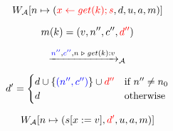 \begin{frame}
\end{frame}

\begin{frame}

  \pause
  \vspace{-0.50cm}
  \[
	W_{\mathcal{A}}[n \mapsto (\textcolor{red}{x \gets get(k);s}, d, u, a, m)]
  \]

  \pause
  \[
	m(k) = (v, n'', c'', \textcolor{red}{d''})
  \]

  \pause
  \[
	\xrightarrow{\textcolor{blue}{n''}, \textcolor{blue}{c''}, n \;\triangleright\; get(k): v}_{\mathcal{A}}
  \]

  \pause
  \[
	d' = \begin{cases}
	  d \cup \{\textcolor{blue}{(n'', c'')}\} \cup \textcolor{red}{d''} & \text{if } n'' \neq n_0 \\
	  d & \text{otherwise}
	\end{cases}
  \]

  \pause
  \[
	W_{\mathcal{A}}[n \mapsto (s[x := v], \textcolor{red}{d'}, u, a, m)]
  \]
\end{frame}

\begin{frame}
  \begin{center}
	\resizebox{0.70\textwidth}{!}{}
  \end{center}

  \begin{columns}
  \end{columns}
\end{frame}

\begin{frame}
\end{frame}
